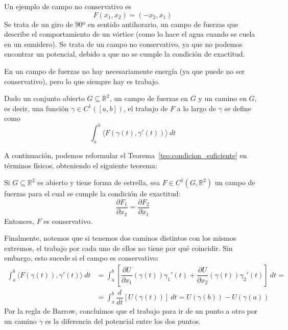 \begin{ejemplo}
    Un ejemplo de campo no conservativo es
    \begin{equation*}
        F(x_1,x_2) = (-x_2, x_1)
    \end{equation*}
    Se trata de un giro de 90º en sentido antihorario, un campo de fuerzas que describe el comportamiento de un vórtice (como lo hace el agua cuando se cuela en un sumidero). Se trata de un campo no conservativo, ya que no podemos encontrar un potencial, debido a que no se cumple la condición de exactitud.
\end{ejemplo}

En un campo de fuerzas no hay necesariamente energía (ya que puede no ser conservativo), pero lo que siempre hay es trabajo.

\begin{definicion}[Trabajo]
    Dado un conjunto abierto $G\subseteq \mathbb{R}^2$, un campo de fuerzas en $G$ y un camino en $G$, es decir, una función $\gamma\in C^1([a,b])$, el trabajo de $F$ a lo largo de $\gamma$ se define como
    \begin{equation*}
        \int_{a}^{b} \langle F(\gamma(t), \gamma'(t)) \rangle~dt 
    \end{equation*}
\end{definicion}

A continuación, podemos reformular el Teorema~\ref{teo:condicion_suficiente} en términos físicos, obteniendo el siguiente teorema:

\begin{teo}
    Si $G\subseteq \mathbb{R}^2$ es abierto y tiene forma de estrella, sea $F\in C^1(G,\mathbb{R}^2)$ un campo de fuerzas para el cual se cumple la condición de exactitud:
    \begin{equation*}
        \dfrac{\partial F_1}{\partial x_2} = \dfrac{\partial F_2}{\partial x_1}
    \end{equation*}
    Entonces, $F$ es conservativo.
\end{teo}

Finalmente, notemos que si tenemos dos caminos distintos con los mismos extremos, el trabajo por cada uno de ellos no tiene por qué coincidir. Sin embargo, esto sucede si el campo es conservativo:
\begin{align*}
    \int_{a}^{b} \langle F(\gamma(t)), \gamma'(t) \rangle~dt  &= \int_{a}^{b} \left[\dfrac{\partial U}{\partial x_1}(\gamma(t))\gamma_1'(t) + \dfrac{\partial U}{\partial x_2}(\gamma(t))\gamma_2'(t)\right]~dt  = \\
                                                              &= \int_{a}^{b} \dfrac{d}{dt}[U(\gamma(t))]~dt = U(\gamma(b)) - U(\gamma(a))
\end{align*}
Por la regla de Barrow, concluimos que el trabajo para ir de un punto a otro por un camino $\gamma$ es la diferencia del potencial entre los dos puntos.\\


